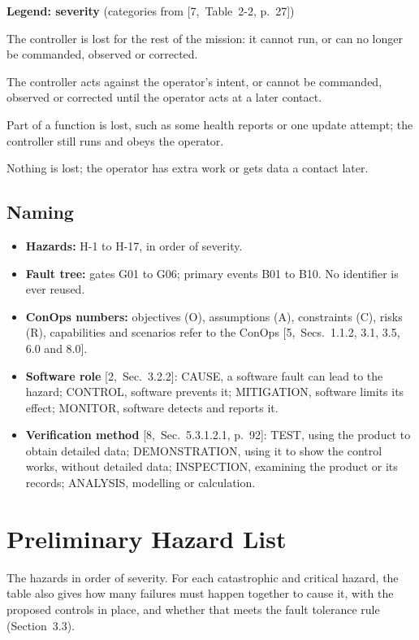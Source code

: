\documentclass[11pt,a4paper]{article}
\begin{document}
\medskip
\noindent\textbf{Legend: severity} (categories from [7,~Table~2-2, p.~27])
\begin{description}[leftmargin=3.9cm]
\item[CATASTROPHIC] The controller is lost for the rest of the mission: it
  cannot run, or can no longer be commanded, observed or corrected.
\item[CRITICAL] The controller acts against the operator's intent, or cannot be
  commanded, observed or corrected until the operator acts at a later contact.
\item[MODERATE] Part of a function is lost, such as some health reports or one
  update attempt; the controller still runs and obeys the operator.
\item[NEGLIGIBLE] Nothing is lost; the operator has extra work or gets data a
  contact later.
\end{description}

\subsection{Naming}
\begin{itemize}
\item \textbf{Hazards:} H-1 to H-17, in order of severity.
\item \textbf{Fault tree:} gates G01 to G06; primary events B01 to B10. No
  identifier is ever reused.
\item \textbf{ConOps numbers:} objectives (O), assumptions (A), constraints
  (C), risks (R), capabilities and scenarios refer to the ConOps
  [5,~Secs.~1.1.2, 3.1, 3.5, 6.0 and 8.0].
\item \textbf{Software role} [2,~Sec.~3.2.2]: CAUSE, a software fault can lead
  to the hazard; CONTROL, software prevents it; MITIGATION, software limits its
  effect; MONITOR, software detects and reports it.
\item \textbf{Verification method} [8,~Sec.~5.3.1.2.1, p.~92]:
  TEST, using the product to obtain detailed data;
  DEMONSTRATION, using it to show the control works, without
  detailed data; INSPECTION, examining the product or its
  records; ANALYSIS, modelling or calculation.
\end{itemize}

\section{Preliminary Hazard List}
The hazards in order of severity. For each catastrophic and
critical hazard, the table also gives how many failures must happen together to
cause it, with the proposed controls in place, and whether that meets the fault
tolerance rule (Section~3.3).
\end{document}
